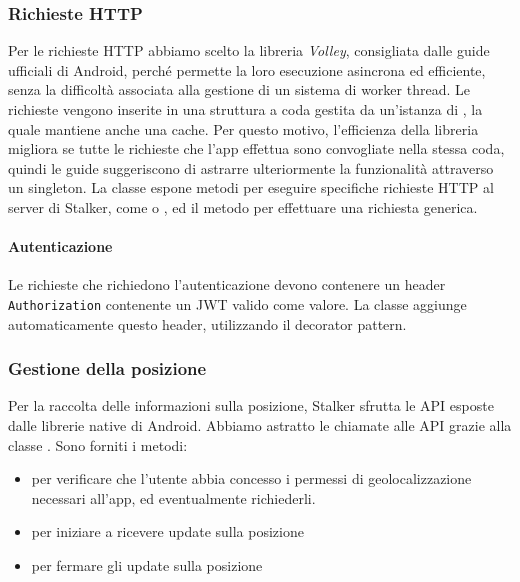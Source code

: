 \documentclass[../../manuale-manutentore.tex]{subfiles}
\begin{document}
\subsubsection{Richieste HTTP}%
\label{subs:richieste_http}

Per le richieste HTTP abbiamo scelto la libreria \textit{Volley}, consigliata dalle guide ufficiali di Android, perché permette la loro esecuzione asincrona ed efficiente, senza la difficoltà associata alla gestione di un sistema di worker thread.
Le richieste vengono inserite in una struttura a coda gestita da un'istanza di , la quale mantiene anche una cache.
Per questo motivo, l'efficienza della libreria migliora se tutte le richieste che l'app effettua sono convogliate nella stessa coda, quindi le guide suggeriscono di astrarre ulteriormente la funzionalità attraverso un singleton.
La classe  espone metodi per eseguire specifiche richieste HTTP al server di Stalker, come  o , ed il metodo  per effettuare una richiesta generica.

\paragraph{Autenticazione}%
\label{par:autenticazione}

Le richieste che richiedono l'autenticazione devono contenere un header \texttt{Authorization} contenente un JWT valido come valore.
La classe  aggiunge automaticamente questo header, utilizzando il decorator pattern.

\subsubsection{Gestione della posizione}%
\label{subs:gestione_della_posizione}

Per la raccolta delle informazioni sulla posizione, Stalker sfrutta le API esposte dalle librerie native di Android.
Abbiamo astratto le chiamate alle API grazie alla classe .
Sono forniti i metodi:

\begin{itemize}
  \item {} per verificare che l'utente abbia concesso i permessi di geolocalizzazione necessari all'app, ed eventualmente richiederli.
  \item {} per iniziare a ricevere update sulla posizione
  \item {} per fermare gli update sulla posizione
\end{itemize}
\end{document}

